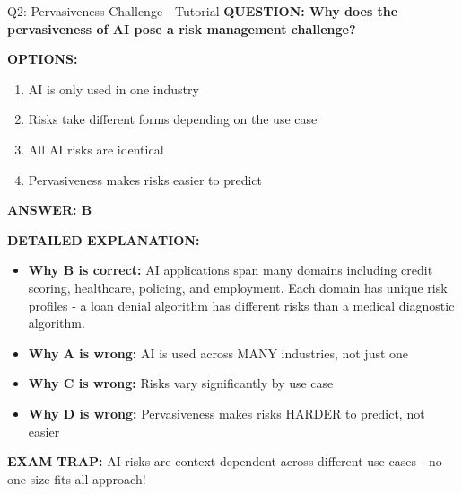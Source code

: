 \documentclass[8pt]{beamer}
\begin{document}
	\begin{frame}{Q2: Pervasiveness Challenge - Tutorial}
		\fontsize{6.5}{7.5}\selectfont
		\textbf{QUESTION: Why does the pervasiveness of AI pose a risk management challenge?}
		
		\vspace{0.1cm}
		\textbf{OPTIONS:}
		\begin{enumerate}
			\item AI is only used in one industry
			\item Risks take different forms depending on the use case
			\item All AI risks are identical
			\item Pervasiveness makes risks easier to predict
		\end{enumerate}
		
		\vspace{0.1cm}
		\textcolor{myblue}{\textbf{ANSWER: B}}
		
		\vspace{0.1cm}
		\textbf{DETAILED EXPLANATION:}
		\begin{itemize}
			\item \textbf{Why B is correct:} AI applications span many domains including credit scoring, healthcare, policing, and employment. Each domain has unique risk profiles - a loan denial algorithm has different risks than a medical diagnostic algorithm.
			\item \textbf{Why A is wrong:} AI is used across MANY industries, not just one
			\item \textbf{Why C is wrong:} Risks vary significantly by use case
			\item \textbf{Why D is wrong:} Pervasiveness makes risks HARDER to predict, not easier
		\end{itemize}
		
		\textcolor{myred}{\textbf{EXAM TRAP:}} AI risks are \textcolor{myblue}{context-dependent} across different use cases - no one-size-fits-all approach!
	\end{frame}
	
\end{document}

